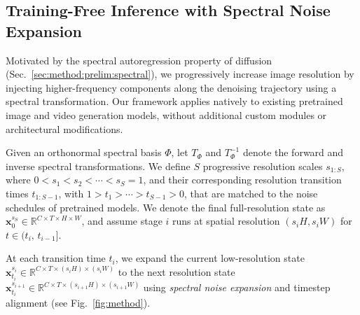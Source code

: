 \subsection{Training-Free Inference with Spectral Noise Expansion}
\label{sec:method:noise-injection}


Motivated by the spectral autoregression property of diffusion (Sec.~\ref{sec:method:prelim:spectral}), we progressively increase image resolution by injecting higher-frequency components along the denoising trajectory using a spectral transformation. Our framework applies natively to existing pretrained image and video generation models, without additional custom modules or architectural modifications.

Given an orthonormal spectral basis $\Phi$, let $T_\Phi$ and $T_\Phi^{-1}$ denote the forward and inverse spectral transformations. We define $S$ progressive resolution scales $s_{1:S}$, where $0 < s_1 < s_2 < \cdots < s_S = 1$, and their corresponding resolution transition times $t_{1:S-1}$, with $1 > t_1 > \cdots > t_{S-1} > 0$, that are matched to the noise schedules of pretrained models. We denote the final full-resolution state as $\mathbf{x}_0^{s_S} \in \mathbb{R}^{C \times T \times H \times W}$, and assume stage $i$ runs at spatial resolution $(s_iH, s_iW)$ for $t \in (t_i,\, t_{i-1}]$. 

At each transition time $t_i$, we expand the current low-resolution state $\mathbf{x}^{s_i}_{t_i} \in \mathbb{R}^{C \times T \times (s_iH) \times (s_iW)}$ to the next resolution state $\mathbf{x}^{s_{i+1}}_{t_i} \in \mathbb{R}^{C \times T \times (s_{i+1}H) \times (s_{i+1} W)}$ using \emph{spectral noise expansion} and timestep alignment (see Fig.~\ref{fig:method}).

